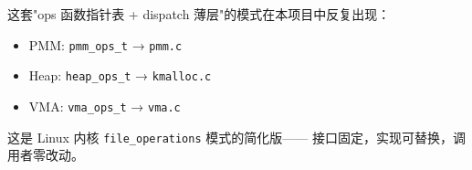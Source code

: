 \begin{designbox}
这套"ops 函数指针表 + dispatch 薄层"的模式在本项目中反复出现：
\begin{itemize}
  \item PMM: \texttt{pmm\_ops\_t} → \texttt{pmm.c}
  \item Heap: \texttt{heap\_ops\_t} → \texttt{kmalloc.c}
  \item VMA: \texttt{vma\_ops\_t} → \texttt{vma.c}
\end{itemize}
这是 Linux 内核 \texttt{file\_operations} 模式的简化版——
接口固定，实现可替换，调用者零改动。
\end{designbox}


